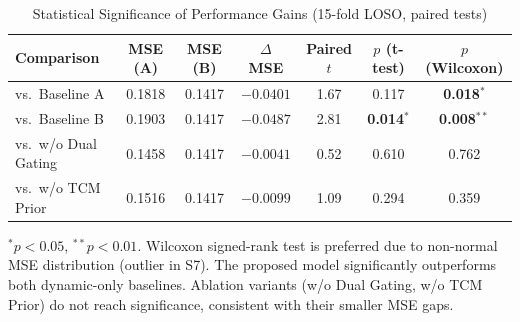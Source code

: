 \documentclass{article}
\begin{document}
\begin{table}[htbp]
\centering
\caption{Statistical Significance of Performance Gains (15-fold LOSO, paired tests)}
\label{tab:significance}
\begin{tabular}{lcccccc}
\toprule
\textbf{Comparison} &
\textbf{MSE (A)} &
\textbf{MSE (B)} &
\textbf{$\Delta$ MSE} &
\textbf{Paired $t$} &
\textbf{$p$ (t-test)} &
\textbf{$p$ (Wilcoxon)} \\
\midrule
vs.\ Baseline A     & 0.1818 & 0.1417 & $-0.0401$ & 1.67 & 0.117  & \textbf{0.018}$^{*}$ \\
vs.\ Baseline B     & 0.1903 & 0.1417 & $-0.0487$ & 2.81 & \textbf{0.014}$^{*}$ & \textbf{0.008}$^{**}$ \\
vs.\ w/o Dual Gating & 0.1458 & 0.1417 & $-0.0041$ & 0.52 & 0.610  & 0.762 \\
vs.\ w/o TCM Prior  & 0.1516 & 0.1417 & $-0.0099$ & 1.09 & 0.294  & 0.359 \\
\bottomrule
\end{tabular}
\vspace{0.5em}

\footnotesize{
$^{*}p < 0.05$, \quad $^{**}p < 0.01$. \quad
Wilcoxon signed-rank test is preferred due to non-normal MSE distribution (outlier in S7).
The proposed model significantly outperforms both dynamic-only baselines.
Ablation variants (w/o Dual Gating, w/o TCM Prior) do not reach significance,
consistent with their smaller MSE gaps.
}
\end{table}
\end{document}

